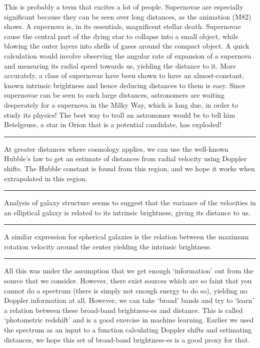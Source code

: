 \documentclass[11pt]{article}
\begin{document}
\noindent This is probably a term that excites a lot of people. Supernovae are especially significant because they can be seen over long distances, as the animation (M82) shows. A supernova is, in its essentials, magnificent stellar death. Supernovae cause the central part of the dying star to collapse into a small object, while blowing the outer layers into shells of gases around the compact object. A quick calculation would involve observing the angular rate of expansion of a supernova and measuring its radial speed towards us, yielding the distance to it. More accurately, a class of supernovae have been shown to have an almost-constant, known intrinsic brightness and hence deducing distances to them is easy. Since supernovae can be seen to such large distances, astronomers are waiting desperately for a supernova in the Milky Way, which is long due, in order to study its physics! The best way to troll an astronomer would be to tell him Betelgeuse, a star in Orion that is a potential candidate, has exploded!

\noindent\rule[0.5ex]{\linewidth}{1pt}

\noindent At greater distances where cosmology applies, we can use the well-known Hubble's law to get an estimate of distances from radial velocity using Doppler shifts. The Hubble constant is found from this region, and we hope it works when extrapolated in this region.

\noindent\rule[0.5ex]{\linewidth}{1pt}

\noindent Analysis of galaxy structure seems to suggest that the variance of the velocities in an elliptical galaxy is related to its intrinsic brightness, giving its distance to us.

\noindent\rule[0.5ex]{\linewidth}{1pt}

\noindent A similar expression for spherical galaxies is the relation between the maximum rotation velocity around the center yielding the intrinsic brightness.

\noindent\rule[0.5ex]{\linewidth}{1pt}

\noindent All this was under the assumption that we get enough `information' out from the source that we consider. However, there exist sources which are so faint that you cannot do a spectrum (there is simply not enough energy to do so), yielding no Doppler information at all. However, we can take `broad' bands and try to `learn' a relation between these broad-band brightness-es and distance. This is called `photometric redshift' and is a good exercise in machine learning. Earlier we used the spectrum as an input to a function calculating Doppler shifts and estimating distances, we hope this set of broad-band brightness-es is a good proxy for that. 
\end{document}

